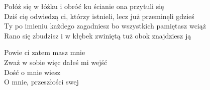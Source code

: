 \begin{text}
\begin{tinyTwo}
    Połóż się w łóżku i obróć ku ścianie ona przytuli się\\
    Dziś cię odwiedzą ci, którzy istnieli, lecz już przeminęli gdzieś\\
    Ty po imieniu każdego zagadniesz bo wszystkich pamiętasz wciąż\\
    Rano się zbudzisz i w kłębek zwiniętą tuż obok znajdziesz ją

    Powie ci zatem masz mnie\\
    Zważ w sobie więc dałeś mi wejść\\
    Dość o mnie wiesz\\
    O mnie, przeszłości swej
    \end{tinyTwo}
\end{text}
\begin{chord}

\end{chord}